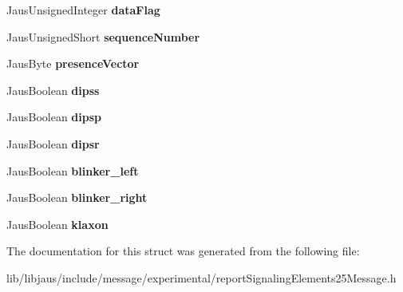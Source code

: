 \begin{DoxyCompactItemize}
\item 
\hypertarget{struct_report_signaling_elements25_message_struct_af946e6846592a6b77b54a0c600c727ca}{\-Jaus\-Unsigned\-Integer {\bfseries data\-Flag}}\label{struct_report_signaling_elements25_message_struct_af946e6846592a6b77b54a0c600c727ca}

\item 
\hypertarget{struct_report_signaling_elements25_message_struct_af1f3a54cb2da2e2c5a02bb112e1f7fc2}{\-Jaus\-Unsigned\-Short {\bfseries sequence\-Number}}\label{struct_report_signaling_elements25_message_struct_af1f3a54cb2da2e2c5a02bb112e1f7fc2}

\item 
\hypertarget{struct_report_signaling_elements25_message_struct_a30069ba3a1a66f0a36fcd151c9822ba7}{\-Jaus\-Byte {\bfseries presence\-Vector}}\label{struct_report_signaling_elements25_message_struct_a30069ba3a1a66f0a36fcd151c9822ba7}

\item 
\hypertarget{struct_report_signaling_elements25_message_struct_a00701bd0b2b7f12cff5f2aa55eef6273}{\-Jaus\-Boolean {\bfseries dipss}}\label{struct_report_signaling_elements25_message_struct_a00701bd0b2b7f12cff5f2aa55eef6273}

\item 
\hypertarget{struct_report_signaling_elements25_message_struct_a1e6c616dd1ea7d03fc397e8883686092}{\-Jaus\-Boolean {\bfseries dipsp}}\label{struct_report_signaling_elements25_message_struct_a1e6c616dd1ea7d03fc397e8883686092}

\item 
\hypertarget{struct_report_signaling_elements25_message_struct_a9720dc35db91493a365c165c769cf3de}{\-Jaus\-Boolean {\bfseries dipsr}}\label{struct_report_signaling_elements25_message_struct_a9720dc35db91493a365c165c769cf3de}

\item 
\hypertarget{struct_report_signaling_elements25_message_struct_a6758961bc3ff89c3ef8d97fe49af23ec}{\-Jaus\-Boolean {\bfseries blinker\-\_\-left}}\label{struct_report_signaling_elements25_message_struct_a6758961bc3ff89c3ef8d97fe49af23ec}

\item 
\hypertarget{struct_report_signaling_elements25_message_struct_afc514bcddc89b3ee2d4fae83473164ba}{\-Jaus\-Boolean {\bfseries blinker\-\_\-right}}\label{struct_report_signaling_elements25_message_struct_afc514bcddc89b3ee2d4fae83473164ba}

\item 
\hypertarget{struct_report_signaling_elements25_message_struct_a3e7b7916d50b2195be2b9f79cd53a87d}{\-Jaus\-Boolean {\bfseries klaxon}}\label{struct_report_signaling_elements25_message_struct_a3e7b7916d50b2195be2b9f79cd53a87d}

\end{DoxyCompactItemize}


\-The documentation for this struct was generated from the following file\-:\begin{DoxyCompactItemize}
\item 
lib/libjaus/include/message/experimental/report\-Signaling\-Elements25\-Message.\-h\end{DoxyCompactItemize}
